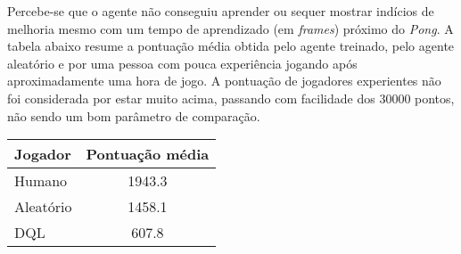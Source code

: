 Percebe-se que o agente não conseguiu aprender ou sequer mostrar indícios de melhoria mesmo com um tempo de aprendizado (em \textit{frames}) próximo do \textit{Pong}.
A tabela abaixo resume a pontuação média obtida pelo agente treinado, pelo agente aleatório e por uma pessoa com pouca experiência jogando após aproximadamente uma hora de jogo.
A pontuação de jogadores experientes não foi considerada por estar muito acima, passando com facilidade dos 30000 pontos, não sendo um bom parâmetro de comparação.

\begin{center}
\begin{tabular}{l c}
\hline
Jogador & Pontuação média \\
\hline
Humano & 1943.3 \\
Aleatório & 1458.1 \\
DQL & 607.8 \\
\hline
\end{tabular}
\label{table:asteroids_score}
\end{center}


%
%


